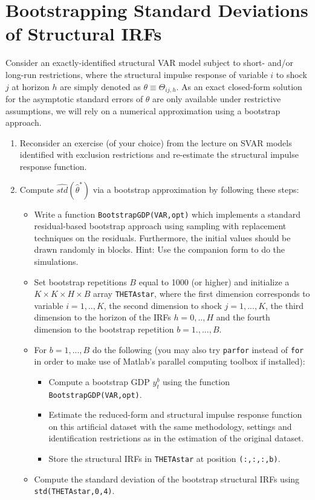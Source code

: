 \section[Bootstrapping Standard Deviations of Structural IRFs]{Bootstrapping Standard Deviations of Structural IRFs\label{ex:BootstrapStandardDeviationStructuralIRFs}}
Consider an exactly-identified structural VAR model subject to short- and/or long-run restrictions,
  where the structural impulse response of variable $i$ to shock $j$ at horizon $h$ are simply denoted as $\theta \equiv \Theta_{ij,h}$.
As an exact closed-form solution for the asymptotic standard errors of $\theta$ are only available under restrictive assumptions,
  we will rely on a numerical approximation using a bootstrap approach.
\begin{enumerate}
\item Reconsider an exercise (of your choice) from the lecture on SVAR models identified with exclusion restrictions and re-estimate the structural impulse response function.

\item Compute $\widehat{std}(\hat{\theta}^\ast)$ via a bootstrap approximation by following these steps:
\begin{itemize}
    \item Write a function \texttt{BootstrapGDP(VAR,opt)} which implements a standard residual-based bootstrap approach
      using sampling with replacement techniques on the residuals.
    Furthermore, the initial values should be drawn randomly in blocks.
    Hint: Use the companion form to do the simulations.
    \item Set bootstrap repetitions $B$ equal to 1000 (or higher)
      and initialize a $K \times K \times H \times B$ array \texttt{THETAstar},
      where the first dimension corresponds to variable $i=1,..,K$,
      the second dimension to shock $j=1,...,K$,
      the third dimension to the horizon of the IRFs $h=0,..,H$
      and the fourth dimension to the bootstrap repetition $b=1.,...,B$.
    \item For $b=1,...,B$ do the following (you may also try \texttt{parfor} instead of \texttt{for}
      in order to make use of Matlab's parallel computing toolbox if installed):
    \begin{itemize}
        \item Compute a bootstrap GDP $y_t^{b}$ using the function \texttt{BootstrapGDP(VAR,opt)}.
        \item Estimate the reduced-form and structural impulse response function on this artificial dataset
          with the same methodology, settings and identification restrictions as in the estimation of the original dataset.
        \item Store the structural IRFs in \texttt{THETAstar} at position \texttt{(:,:,:,b)}.
    \end{itemize}
	\item Compute the standard deviation of the bootstrap structural IRFs using \texttt{std(THETAstar,0,4)}.
\end{itemize}


\end{enumerate}
